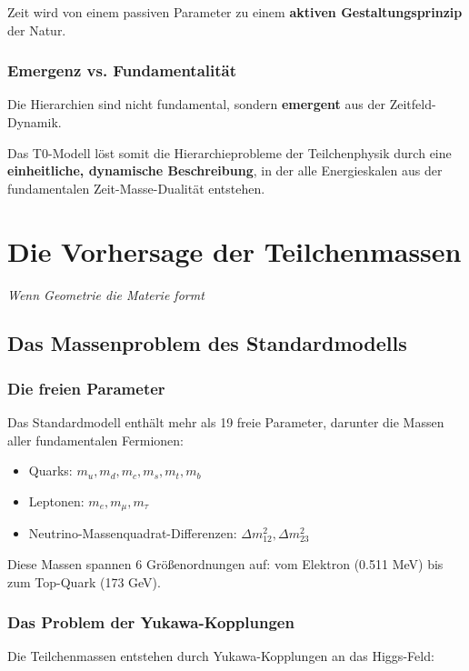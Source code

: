 \documentclass[12pt,a4paper]{report}
\begin{document}
	Zeit wird von einem passiven Parameter zu einem \textbf{aktiven Gestaltungsprinzip} der Natur.
	
	\subsection{Emergenz vs. Fundamentalität}
	
	Die Hierarchien sind nicht fundamental, sondern \textbf{emergent} aus der Zeitfeld-Dynamik.
	
	Das T0-Modell löst somit die Hierarchieprobleme der Teilchenphysik durch eine \textbf{einheitliche, dynamische Beschreibung}, in der alle Energieskalen aus der fundamentalen Zeit-Masse-Dualität entstehen.
	\chapter{Die Vorhersage der Teilchenmassen}
	\textit{Wenn Geometrie die Materie formt}
	
	\section{Das Massenproblem des Standardmodells}
	
	\subsection{Die freien Parameter}
	
	Das Standardmodell enthält mehr als 19 freie Parameter, darunter die Massen aller fundamentalen Fermionen:
	
	\begin{itemize}
		\item Quarks: $m_u, m_d, m_c, m_s, m_t, m_b$
		\item Leptonen: $m_e, m_\mu, m_\tau$
		\item Neutrino-Massenquadrat-Differenzen: $\Delta m_{12}^2, \Delta m_{23}^2$
	\end{itemize}
	
	Diese Massen spannen 6 Größenordnungen auf: vom Elektron (0.511 MeV) bis zum Top-Quark (173 GeV).
	
	\subsection{Das Problem der Yukawa-Kopplungen}
	
	Die Teilchenmassen entstehen durch Yukawa-Kopplungen an das Higgs-Feld:
	
\end{document}
